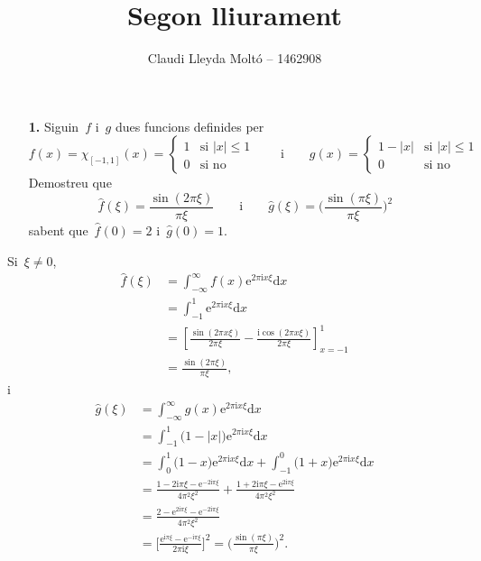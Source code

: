 \documentclass[a4paper]{article}
\title{Segon lliurament}
\author{Claudi Lleyda Moltó -- 1462908}
\theoremstyle{definition}
\newcommand{\iu}{\mathrm{i}}
\newcommand{\e}{\mathrm{e}}
\newcommand{\uppi}{\pi}
\newcommand{\diff}{\mathrm{d}}
\newcommand{\abs}[1]{\lvert{#1}\rvert}
\begin{document}
\maketitle

\begin{enumerate}
    \item[\textbf{1.}] Siguin~\(f\) i~\(g\) dues funcions definides per
        \[
            f(x) = \chi_{[-1,1]}(x) = \begin{cases}
                1 & \text{si } \abs{x} \leq 1 \\
                0 & \text{si no}
            \end{cases}
            \qquad\text{i}\qquad
            g(x) = \begin{cases}
                1 - \abs{x} & \text{si } \abs{x} \leq 1 \\
                0 & \text{si no}
            \end{cases}
        \]
        Demostreu que
        \[
            \widehat{f}(\xi) = \frac{\sin(2\uppi\xi)}{\uppi\xi}
            \qquad\text{i}\qquad
            \widehat{g}(\xi) = \biggl(\frac{\sin(\uppi\xi)}{\uppi\xi}\biggr)^{2}
        \]
        sabent que~\(\widehat{f}(0) = 2\) i~\(\widehat{g}(0) = 1\).
\end{enumerate}

Si~\(\xi \neq 0\),
\begin{align*}
    \widehat{f}(\xi) &= \int_{-\infty}^{\infty}
                        f(x) \e^{2\uppi\iu x\xi}\diff x \\
                     &= \int_{-1}^{1}
                        \e^{2\uppi\iu x\xi} \diff x \\
                     &= \left[
                         \frac{\sin(2\uppi x\xi)}{2\uppi\xi}
                         - \frac{\iu\cos(2\uppi x\xi)}{2\uppi\xi}
                     \right]_{x = -1}^{1}\\
                     &= \frac{\sin(2\uppi\xi)}{\uppi\xi},
\end{align*}
i
\begin{align*}
    \widehat{g}(\xi) &= \int_{-\infty}^{\infty}
                        g(x) \e^{2\uppi\iu x\xi}\diff x \\
                     &= \int_{-1}^{1}
                        \bigl(1-\abs{x}\bigr) \e^{2\uppi\iu x\xi}\diff x \\
                     &= \int_{0}^{1}
                        \bigl(1-x\bigr) \e^{2\uppi\iu x\xi}\diff x
                      + \int_{-1}^{0}
                        \bigl(1+x\bigr) \e^{2\uppi\iu x\xi}\diff x \\
                     &= \frac{1-2\iu\uppi\xi-\e^{-2\iu\uppi\xi}}{4\uppi^{2}\xi^{2}}
                      + \frac{1+2\iu\uppi\xi-\e^{2\iu\uppi\xi}}{4\uppi^{2}\xi^{2}} \\
                     &= \frac{2-\e^{2\iu\uppi\xi}-\e^{-2\iu\uppi\xi}}{4\uppi^{2}\xi^{2}} \\
                     &= \biggl[
                        \frac{\e^{\iu\uppi\xi}-\e^{-\iu\uppi\xi}}{2\uppi\iu\xi}
                        \biggr]^{2}
                      = \biggl(\frac{\sin(\uppi\xi)}{\uppi\xi}\biggr)^{2}.
\end{align*}
\end{document}

